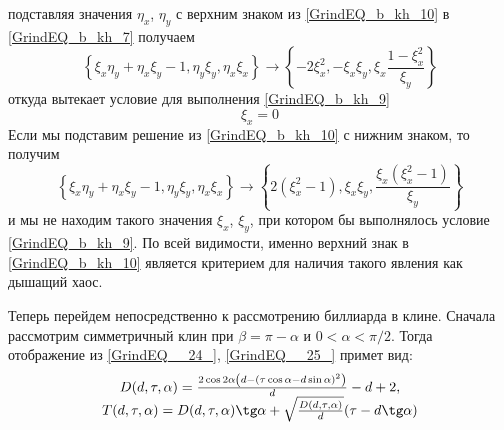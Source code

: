 \documentclass[a4paper]{article}
\begin{document}
подставляя значения $\eta_x$, $\eta_y$ с верхним знаком из \eqref{GrindEQ_b_kh_10} в \eqref{GrindEQ_b_kh_7} получаем
\begin{equation}
\left\{\xi _x \eta _y+\eta _x \xi _y-1,\eta _y \xi _y,\eta _x \xi _x\right\}\rightarrow\left\{-2 \xi _x^2,-\xi _x \xi _y,\xi _x\frac{1-\xi _x^2}{\xi _y}\right\}
\end{equation}
откуда вытекает условие для выполнения \eqref{GrindEQ_b_kh_9}
\begin{equation}
\xi _x=0
\end{equation}
Если мы подставим решение из \eqref{GrindEQ_b_kh_10} с нижним знаком, то получим
\begin{equation}
\left\{\xi _x \eta _y+\eta _x \xi _y-1,\eta _y \xi _y,\eta _x \xi _x\right\}\rightarrow\left\{2 \left(\xi _x^2-1\right),\xi _x \xi _y,\frac{\xi _x \left(\xi _x^2-1\right)}{\xi _y}\right\}
\end{equation}
и мы не находим такого значения $\xi _x$, $\xi _y$, при котором бы выполнялось условие \eqref{GrindEQ_b_kh_9}.
 По всей видимости, именно верхний знак в  \eqref{GrindEQ_b_kh_10} является критерием для наличия такого явления как дышащий хаос.
 
Теперь перейдем непосредственно к рассмотрению биллиарда в клине. Сначала рассмотрим симметричный клин при $\beta = \pi-\alpha$ и $0<\alpha<\pi/2$. Тогда отображение из \eqref{GrindEQ__24_}, \eqref{GrindEQ__25_} примет вид:
\begin{equation} \label{GrindEQ_b_kh_11}
\begin{array}{c}
 D(d,\tau,\alpha)=\frac{2\cos 2 \alpha  \left(d-(\tau  \cos \alpha-d \sin\alpha)^2\right)}{d }-d+2, \\
 T(d,\tau ,\alpha )=D(d,\tau,\alpha)\tg \alpha +\sqrt{\frac{D(d,\tau,\alpha)}{d}} (\tau -d \tg \alpha) \\
\end{array}
\end{equation}

\end{document}
